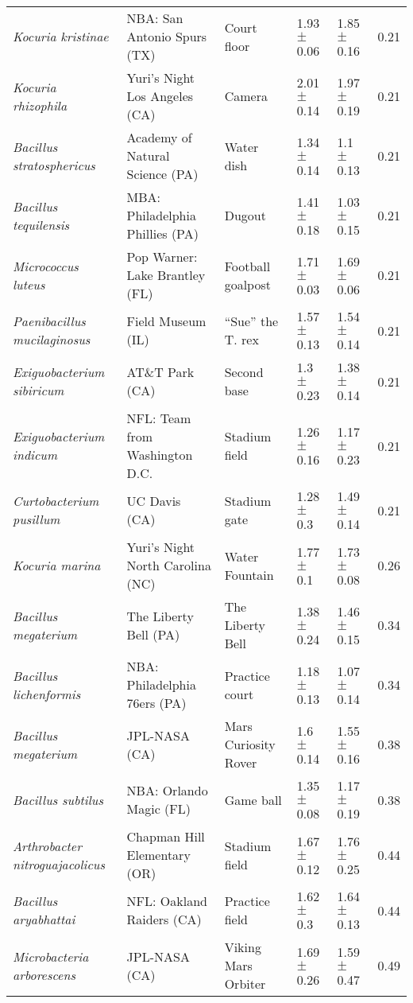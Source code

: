 \begin{table}[]
{\begin{tabular}{@{}llllll@{}}
\textit{Kocuria kristinae} & NBA: San Antonio Spurs (TX) & Court floor & 1.93 $\pm$ 0.06 & 1.85 $\pm$ 0.16 & 0.21 \\
\textit{Kocuria rhizophila} & Yuri’s Night Los Angeles (CA) & Camera & 2.01 $\pm$ 0.14 & 1.97 $\pm$ 0.19 & 0.21 \\
\textit{Bacillus stratosphericus} & Academy of Natural Science (PA) & Water dish & 1.34 $\pm$ 0.14 & 1.1 $\pm$ 0.13 & 0.21 \\
\textit{Bacillus tequilensis} & MBA: Philadelphia Phillies (PA) & Dugout & 1.41 $\pm$ 0.18 & 1.03 $\pm$ 0.15 & 0.21 \\
\textit{Micrococcus luteus} & Pop Warner: Lake Brantley (FL) & Football goalpost & 1.71 $\pm$ 0.03 & 1.69 $\pm$ 0.06 & 0.21 \\
\textit{Paenibacillus mucilaginosus} & Field Museum (IL) & “Sue” the T. rex & 1.57 $\pm$ 0.13 & 1.54 $\pm$ 0.14 & 0.21 \\
\textit{Exiguobacterium sibiricum} & AT\&T Park (CA) & Second base & 1.3 $\pm$ 0.23 & 1.38 $\pm$ 0.14 & 0.21 \\
\textit{Exiguobacterium indicum} & NFL: Team from Washington D.C. & Stadium field & 1.26 $\pm$ 0.16 & 1.17 $\pm$ 0.23 & 0.21 \\
\textit{Curtobacterium pusillum} & UC Davis (CA) & Stadium gate & 1.28 $\pm$ 0.3 & 1.49 $\pm$ 0.14 & 0.21 \\
\textit{Kocuria marina} & Yuri’s Night North Carolina (NC) & Water Fountain & 1.77 $\pm$ 0.1 & 1.73 $\pm$ 0.08 & 0.26 \\
\textit{Bacillus megaterium} & The Liberty Bell (PA) & The Liberty Bell & 1.38 $\pm$ 0.24 & 1.46 $\pm$ 0.15 & 0.34 \\
\textit{Bacillus lichenformis} & NBA: Philadelphia 76ers (PA) & Practice court & 1.18 $\pm$ 0.13 & 1.07 $\pm$ 0.14 & 0.34 \\
\textit{Bacillus megaterium} & JPL-NASA (CA) & Mars Curiosity Rover & 1.6 $\pm$ 0.14 & 1.55 $\pm$ 0.16 & 0.38 \\
\textit{Bacillus subtilus} & NBA: Orlando Magic (FL) & Game ball & 1.35 $\pm$ 0.08 & 1.17 $\pm$ 0.19 & 0.38 \\
\textit{Arthrobacter nitroguajacolicus} & Chapman Hill Elementary (OR) & Stadium field & 1.67 $\pm$ 0.12 & 1.76 $\pm$ 0.25 & 0.44 \\
\textit{Bacillus aryabhattai} & NFL: Oakland Raiders (CA) & Practice field & 1.62 $\pm$ 0.3 & 1.64 $\pm$ 0.13 & 0.44 \\
\textit{Microbacteria arborescens} & JPL-NASA (CA) & Viking Mars Orbiter & 1.69 $\pm$ 0.26 & 1.59 $\pm$ 0.47 & 0.49 \\

\end{tabular}}
\end{table}
